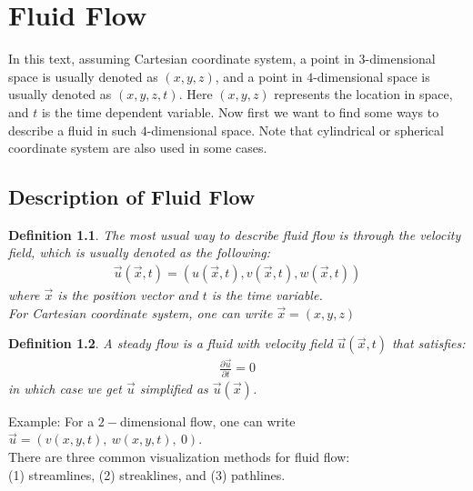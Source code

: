 \documentclass[11pt]{book}
\theoremstyle{break}
\theoremstyle{break}
\newtheorem{defn}{Definition}[corL]
\newcommand{\example}{\color{green}Example: \color{black}}
\begin{document}
\newpage 
\tableofcontents
{}

\newpage
\setcounter{page}{1}
\vspace*{\fill}


\newpage
\chapter{Fluid Flow}
In this text, assuming Cartesian coordinate system, a point in $3$-dimensional space is usually denoted as $(x,y,z)$, and a point in $4$-dimensional space is usually denoted as $(x,y,z,t)$. Here $(x,y,z)$ represents the location in space, and $t$ is the time dependent variable. Now first we want to find some ways to describe a fluid in such $4$-dimensional space. Note that cylindrical or spherical coordinate system are also used in some cases.\\


\section[Descriptions of Fluid Flow]{\color{red}Description of Fluid Flow\color{black}}

\begin{defn}
The most usual way to describe fluid flow is through the velocity field, which is usually denoted as the following:
\begin{align}
\vec{u}(\vec{x}, t) = (u(\vec{x},t),v(\vec{x},t),w(\vec{x},t))
\end{align}
where $\vec{x}$ is the position vector and $t$ is the time variable. \\
For Cartesian coordinate system, one can write $\vec{x} = (x,y,z)$\\
\end{defn}


\begin{defn}
A steady flow is a fluid with velocity field $\vec{u}(\vec{x}, t)$ that satisfies:
\begin{align}
\frac{\partial \vec{u}}{\partial t} = 0 
\end{align}
in which case we get $\vec{u}$ simplified as $\vec{u}(\vec{x})$. 
\end{defn}


\example For a $2-$dimensional flow, one can write $\vec{u} =(v(x,y,t),\ w(x,y,t), \ 0)$.\\

There are three common visualization methods for fluid flow: \\
(1) streamlines, (2) streaklines, and (3) pathlines. \\
\end{document}
